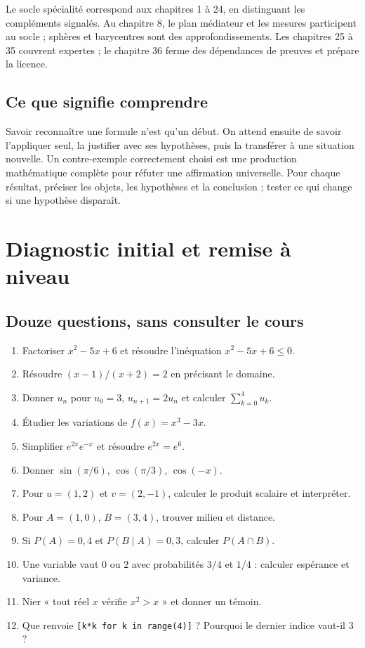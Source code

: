 Le socle spécialité correspond aux chapitres 1 à 24, en distinguant les compléments signalés. Au chapitre 8, le plan médiateur et les mesures participent au socle ; sphères et barycentres sont des approfondissements. Les chapitres 25 à 35 couvrent expertes ; le chapitre 36 ferme des dépendances de preuves et prépare la licence.
\section{Ce que signifie comprendre}
Savoir reconnaître une formule n'est qu'un début. On attend ensuite de savoir l'appliquer seul, la justifier avec ses hypothèses, puis la transférer à une situation nouvelle. Un contre-exemple correctement choisi est une production mathématique complète pour réfuter une affirmation universelle.
Pour chaque résultat, préciser les objets, les hypothèses et la conclusion ; tester ce qui change si une hypothèse disparaît.
\chapter{Diagnostic initial et remise à niveau}
\small
\section{Douze questions, sans consulter le cours}
\begin{enumerate}
\item Factoriser $x^2-5x+6$ et résoudre l'inéquation $x^2-5x+6\le0$.
\item Résoudre $(x-1)/(x+2)=2$ en précisant le domaine.
\item Donner $u_n$ pour $u_0=3$, $u_{n+1}=2u_n$ et calculer $\sum_{k=0}^4u_k$.
\item Étudier les variations de $f(x)=x^3-3x$.
\item Simplifier $e^{2x}e^{-x}$ et résoudre $e^{2x}=e^6$.
\item Donner $\sin(\pi/6)$, $\cos(\pi/3)$, $\cos(-x)$.
\item Pour $u=(1,2)$ et $v=(2,-1)$, calculer le produit scalaire et interpréter.
\item Pour $A=(1,0)$, $B=(3,4)$, trouver milieu et distance.
\item Si $P(A)=0{,}4$ et $P(B\mid A)=0{,}3$, calculer $P(A\cap B)$.
\item Une variable vaut $0$ ou $2$ avec probabilités $3/4$ et $1/4$ : calculer espérance et variance.
\item Nier « tout réel $x$ vérifie $x^2>x$ » et donner un témoin.
\item Que renvoie \texttt{[k*k for k in range(4)]} ? Pourquoi le dernier indice vaut-il 3 ?
\end{enumerate}
